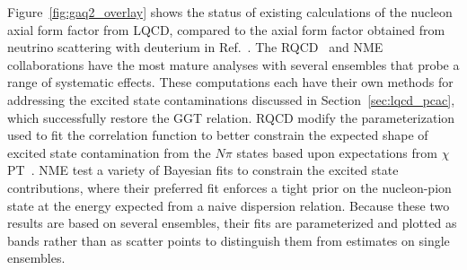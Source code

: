 \documentclass{ar-1col}
\begin{document}
Figure~\ref{fig:gaq2_overlay} shows the status of existing calculations of
 the nucleon axial form factor from LQCD,
 compared to the axial form factor obtained from neutrino scattering
 with deuterium in Ref.~\cite{Meyer:2016oeg}.
The RQCD~\cite{RQCD:2019jai} and NME~\cite{Park:2021ypf} collaborations
 have the most mature analyses with several ensembles that probe a range of
 systematic effects.
These computations each have their own methods for addressing the
 excited state contaminations discussed in Section~\ref{sec:lqcd_pcac},
 which successfully restore the GGT relation.
RQCD modify the parameterization used to fit the correlation function
 to better constrain the expected shape of excited state contamination from the $N\pi$ states based upon expectations from $\chi$PT~\cite{Bar:2018xyi}.
NME test a variety of Bayesian fits to constrain the excited state contributions,
 where their preferred fit enforces a tight prior on the nucleon-pion state
 at the energy expected from a naive dispersion relation.
Because these two results are based on several ensembles,
 their fits are parameterized and plotted as bands rather than as scatter points
 to distinguish them from estimates on single ensembles.
\end{document}
